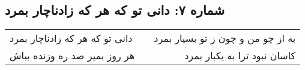\begin{center}
\section*{شماره ۷: دانی تو که هر که زادناچار بمرد}
\label{sec:007}
\begin{longtable}{l p{0.5cm} r}
دانی تو که هر که زادناچار بمرد
&&
به از چو من و چون ز تو بسیار بمرد
\\
هر روز بمیر صد ره وزنده بباش
&&
کاسان نبود ترا به یکبار بمرد
\\
\end{longtable}
\end{center}
